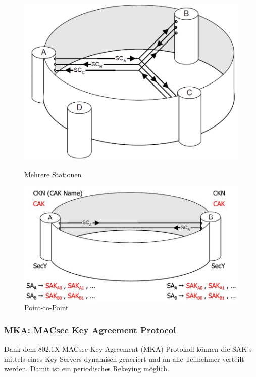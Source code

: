 \begin{figure}[ht!]
	\centering
	\begin{minipage}[t]{0.4\textwidth}
		\centering
		\includegraphics[width=0.9\linewidth]{images/macsec-overview-sc.png}
		\caption{Mehrere Stationen}
	\end{minipage}
	\begin{minipage}[t]{0.4\textwidth}
		\centering
		\includegraphics[width=0.9\linewidth]{images/macsec_sc_sa}
		\caption{Point-to-Point}
	\end{minipage}
\end{figure}
\subsubsection{MKA: MACsec Key Agreement Protocol}
Dank dem 802.1X MACsec Key Agreement (MKA) Protokoll
können die SAK's mittels eines Key Servers dynamisch generiert und an alle Teilnehmer verteilt werden. Damit ist ein periodisches Rekeying möglich.

